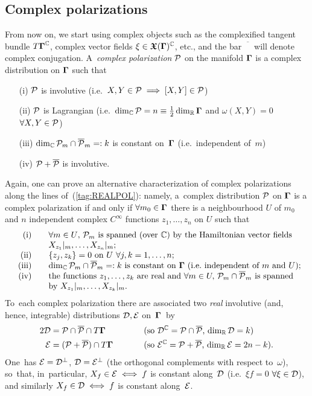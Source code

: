 \documentclass[12pt]{amsart}
\numberwithin{equation}{section}
\theoremstyle{remark}
\newcommand\Omg{{\bigam}}   %
\newcommand\PP{{\Cal P}}
\newcommand\DD{{\Cal D}}
\newcommand\EE{{\Cal E}}
\newcommand\RR{\mathbb R}
\newcommand{\CC}{\C}
\newcommand{\bigam}{\mbox{\boldmath $\Gamma$}}
\newcommand{\bfrakX}{\mbox{\boldmath $\mathfrak X$}}
\newcommand{\C}{\mathbb C}
\begin{document}
\subsection{Complex polarizations}\label{sec23}
From now on, we start using complex objects such as the complexified tangent
bundle $T\Omg^\CC$, complex vector fields $\xi\in \bfrakX(\Omg)^\CC$, etc., and
the bar $\overline{\phantom X}$ will denote complex conjugation. A~{\it complex
polarization\/} $\PP$ on the manifold $\Omg$ is a complex distribution on
$\Omg$ such that \begin{enumerate}
\item[(i)] $\PP$ is involutive (i.e.~$X,Y\in\PP\implies[X,Y]\in\PP$)
\item[(ii)] $\PP$ is Lagrangian (i.e.~$\dim_\CC\PP=n\equiv\tfrac12\dim_\RR\Omg$
and $\omega(X,Y)=0$ $\forall X,Y\in\PP$)
\item[(iii)] $\dim_\CC \PP_m\cap\overline\PP_m=:k$ is constant on~$\Omg$
(i.e.~independent of~$m$)
\item[(iv)] $\PP+\overline\PP$ is involutive.  \end{enumerate}
Again, one can prove an alternative characterization of complex polarizations
along the lines of~(\ref{tag:REALPOL}): namely, a~complex distribution $\PP$ on
$\Omg$ is a complex polarization if and only if $\forall m_0\in \Omg$ there is
a neighbourhood $U$ of $m_0$ and $n$ independent complex $C^\infty$ functions
$z_1,\dots,z_n$ on $U$ such that
\begin{equation}   \begin{array}{rl}
\text{(i) }&\text{$\forall m\in U$, $\PP_m$ is spanned (over~$\CC$) by the
Hamiltonian vector fields}\\
&\text{$X_{z_1}|_m,\dots,X_{z_n}|_m$;} \\
\text{(ii) }&\text{$\{z_j,z_k\}=0$ on $U$ $\forall j,k=1,\dots,n$;} \\
\text{(iii) }&\text{$\dim_\CC \PP_m\cap\overline\PP_m=:k$ is constant on~$\Omg$
(i.e.~independent of~$m$ and~$U$);} \\
\text{(iv) }&\text{the functions $z_1,\dots,z_k$ are real and $\forall m\in U,$
$\PP_m\cap\overline\PP_m$ is spanned} \\
&\text{by $X_{z_1}|_m,\dots,X_{z_k}|_m$.}
\end{array}   \label{tag:CPLXPOL}  \end{equation}
To~each complex polarization there are associated two {\it real}
involutive (and, hence, integrable) distributions $\DD,\EE$ on~$\Omg$~by
\begin{alignat*} 2
\DD &= \PP\cap\overline\PP\cap T\Omg \qquad &&\text{(so
$\DD^\CC=\PP\cap\overline\PP$, $\dim_\RR\DD=k$)} \\
\EE &= (\PP+\overline\PP)\cap T\Omg \qquad &&\text{(so
$\EE^\CC=\PP+\overline\PP$, $\dim_\RR\EE=2n-k$)}.  \end{alignat*}
One~has $\EE=\DD^\perp$, $\DD=\EE^\perp$ (the orthogonal complements with
respect to~$\omega$), so~that, in~particular, $X_f\in\EE\iff f$ is constant
along~$\DD$ (i.e.~$\xi f=0$ $\forall\xi\in\DD$), and similarly $X_f\in\DD\iff
f$ is constant along~$\EE$.
\end{document}
